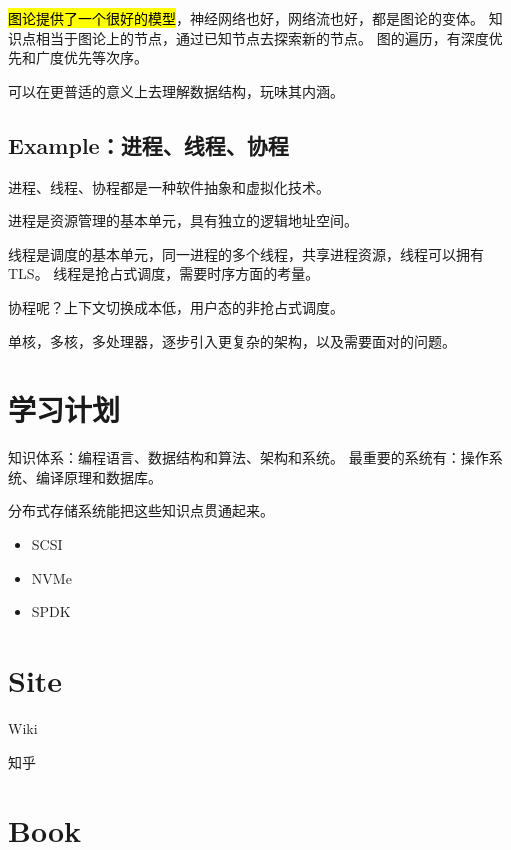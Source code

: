 \hl{图论提供了一个很好的模型}，神经网络也好，网络流也好，都是图论的变体。
知识点相当于图论上的节点，通过已知节点去探索新的节点。
图的遍历，有深度优先和广度优先等次序。

可以在更普适的意义上去理解数据结构，玩味其内涵。

\subsection{Example：进程、线程、协程}

进程、线程、协程都是一种软件抽象和虚拟化技术。

进程是资源管理的基本单元，具有独立的逻辑地址空间。

线程是调度的基本单元，同一进程的多个线程，共享进程资源，线程可以拥有TLS。
线程是抢占式调度，需要时序方面的考量。

协程呢？上下文切换成本低，用户态的非抢占式调度。

单核，多核，多处理器，逐步引入更复杂的架构，以及需要面对的问题。


\section{学习计划}

知识体系：编程语言、数据结构和算法、架构和系统。
最重要的系统有：操作系统、编译原理和数据库。

分布式存储系统能把这些知识点贯通起来。

\begin{itemize}
    \item SCSI
    \item NVMe
    \item SPDK
\end{itemize}

\section{Site}

\begin{enumbox}
\item Wiki
\item 知乎
\end{enumbox}

\section{Book}

